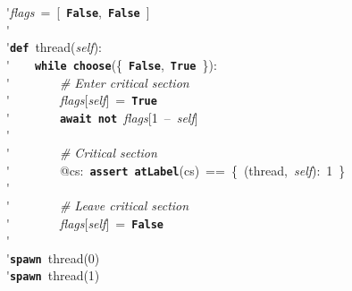 \'\>\textit{flags}~=~[~\texttt{\textbf{False}},~\texttt{\textbf{False}}~]\\

\'\>\\

\'\>\texttt{\textbf{def}}~thread(\textit{self}):\\

\'\>~~~~\texttt{\textbf{while}}~\texttt{\textbf{choose}}(\{~\texttt{\textbf{False}},~\texttt{\textbf{True}}~\}):\\

\'\>~~~~~~~~\emph{\# Enter critical section}\\

\'\>~~~~~~~~\textit{flags}[\textit{self}]~=~\texttt{\textbf{True}}\\

\'\>~~~~~~~~\texttt{\textbf{await}}~\texttt{\textbf{not}}~\textit{flags}[1~--~\textit{self}]\\

\'\>\\

\'\>~~~~~~~~\emph{\# Critical section}\\

\'\>~~~~~~~~@cs:~\texttt{\textbf{assert}}~\texttt{\textbf{atLabel}}(cs)~==~\{~(thread,~\textit{self}):~1~\}\\

\'\>\\

\'\>~~~~~~~~\emph{\# Leave critical section}\\

\'\>~~~~~~~~\textit{flags}[\textit{self}]~=~\texttt{\textbf{False}}\\

\'\>\\

\'\>\texttt{\textbf{spawn}}~thread(0)\\

\'\>\texttt{\textbf{spawn}}~thread(1)
